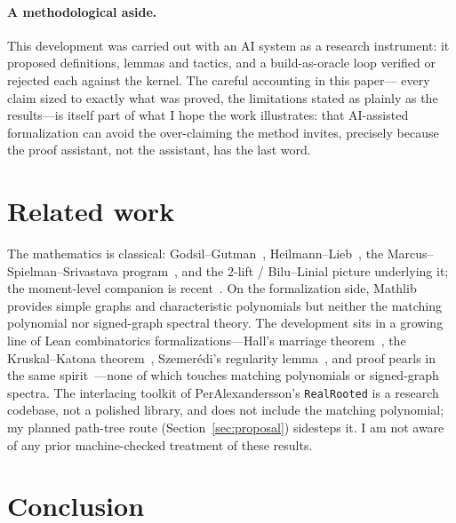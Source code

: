 \documentclass[11pt]{article}
\begin{document}
\paragraph{A methodological aside.}
This development was carried out with an AI system as a research instrument: it
proposed definitions, lemmas and tactics, and a build-as-oracle loop verified
or rejected each against the kernel. The careful accounting in this paper---
every claim sized to exactly what was proved, the limitations stated as plainly
as the results---is itself part of what I hope the work illustrates: that
AI-assisted formalization can avoid the over-claiming the method invites,
precisely because the proof assistant, not the assistant, has the last word.

\section{Related work}
\label{sec:related}

The mathematics is classical: Godsil--Gutman~\cite{GodsilGutman1981},
Heilmann--Lieb~\cite{HeilmannLieb1972}, the Marcus--Spielman--Srivastava
program~\cite{MSS2015a,MSS2015b}, and the $2$-lift / Bilu--Linial picture
underlying it; the moment-level companion is recent~\cite{ChenVanDamBu2023}.
On the formalization side, Mathlib~\cite{Mathlib2020} provides simple graphs and
characteristic polynomials but neither the matching polynomial nor signed-graph
spectral theory. The development sits in a growing line of Lean combinatorics
formalizations---Hall's marriage theorem~\cite{GusakovMehtaMiller2021}, the
Kruskal--Katona theorem~\cite{Mehta2022KruskalKatona}, Szemer\'edi's regularity
lemma~\cite{DilliesMehta2022}, and proof pearls in the same
spirit~\cite{Mehta2023Sharkovsky}---none of which touches matching polynomials or
signed-graph spectra. The interlacing toolkit of PerAlexandersson's
\texttt{RealRooted} is a research codebase, not a polished library, and does not
include the matching polynomial; my planned path-tree route
(Section~\ref{sec:proposal}) sidesteps it.
I am not aware of any prior machine-checked treatment of these results.

\section{Conclusion}
\end{document}
